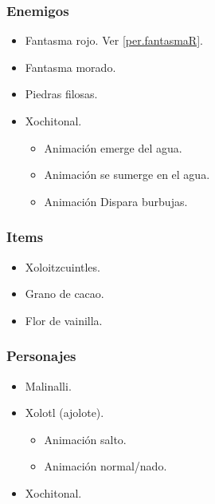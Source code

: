 \documentclass[11pt,letterpaper]{article}
\begin{document}
	\subsubsection{Enemigos}
	\begin{itemize}
		\item Fantasma rojo. Ver \ref{per.fantasmaR}.
		\item Fantasma morado. 
		\item Piedras filosas. 
		\item Xochitonal.
			\begin{itemize}
				\item Animación emerge del agua.
				\item Animación se sumerge en el agua.
				\item Animación Dispara burbujas.  
			\end{itemize}
	\end{itemize}
	\subsubsection{Items}
	\begin{itemize}
		\item Xoloitzcuintles.
		\item Grano de cacao.
		\item Flor de vainilla.
	\end{itemize}
	\subsubsection{Personajes}
	\begin{itemize}
		\item Malinalli.
		\item Xolotl (ajolote).
			\begin{itemize}
				\item Animación salto.
				\item Animación normal/nado.
			\end{itemize}
		\item Xochitonal.
	\end{itemize}
	
\end{document}
